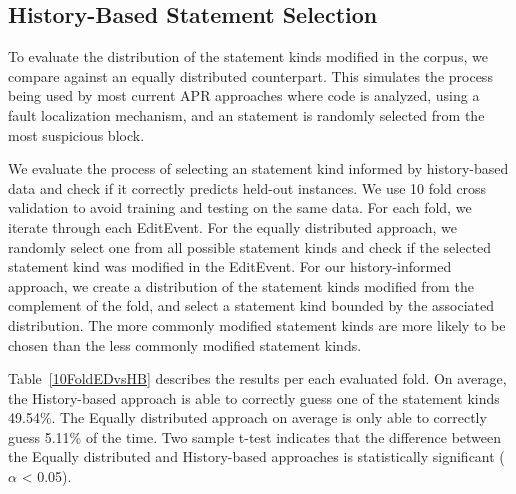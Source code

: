 \documentclass[sigconf]{acmart}
\begin{document}
\subsection{History-Based Statement Selection}

To evaluate the distribution of the statement kinds modified
in the corpus, we compare against an equally distributed counterpart.
This simulates the process being used by most current APR approaches
where code is analyzed, using a fault localization 
mechanism, and an statement is randomly selected from the most
suspicious block.

We evaluate the process of selecting an statement kind informed by 
history-based data and check if it correctly predicts held-out 
instances.
We use 10 fold
cross validation to avoid training and testing on the same data.
For each fold, we
iterate through each EditEvent. For
the equally distributed approach, we randomly select one from 
all possible statement kinds and check if the selected
statement kind was modified in the EditEvent.
For our history-informed approach, we create a distribution
of the statement kinds modified from the complement of the fold, 
and select a statement
kind bounded by the associated distribution.
The more commonly modified statement
kinds are more likely to be chosen than the less commonly modified
statement kinds.

Table~\ref{10FoldEDvsHB} describes the results per each evaluated fold.
On average, 
the History-based approach is able to correctly guess one of the statement kinds
49.54\%. The Equally distributed approach
on average is only able to correctly guess 5.11\% of the time.
Two sample t-test indicates that the difference between the Equally distributed
and History-based approaches is statistically significant ($\alpha$ < 0.05).
\end{document}
